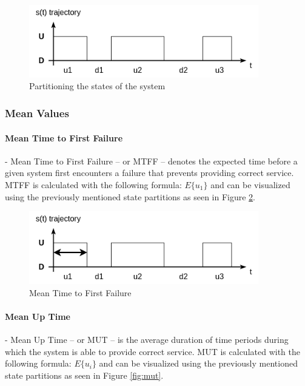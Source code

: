 \begin{figure}[h]
	\centering
	\includegraphics[width=100mm, keepaspectratio]{figures/system_state_partitions.png}
	\caption{ Partitioning the states of the system \cite{DependabilityBMEMIT} }
	\label{fig:system_state_partitions}
\end{figure}

\subsubsection{Mean Values} \label{background-dep-metrics-mean-values}

\paragraph{Mean Time to First Failure} - Mean Time to First Failure -- or MTFF -- denotes the expected time before a given system first encounters a failure that prevents providing correct service. MTFF is calculated with the following formula: \(E\{u_1\}\) and can be visualized using the previously mentioned state partitions as seen in Figure \ref{fig:mtff}.

\begin{figure}[h]
	\centering
	\includegraphics[width=100mm, keepaspectratio]{figures/MTFF.png}
	\caption{ Mean Time to First Failure \cite{DependabilityBMEMIT} }
	\label{fig:mtff}
\end{figure}

\paragraph{Mean Up Time} - Mean Up Time -- or MUT -- is the average duration of time periods during which the system is able to provide correct service. MUT is calculated with the following formula: \(E\{u_i\}\) and can be visualized using the previously mentioned state partitions as seen in Figure \ref{fig:mut}.

